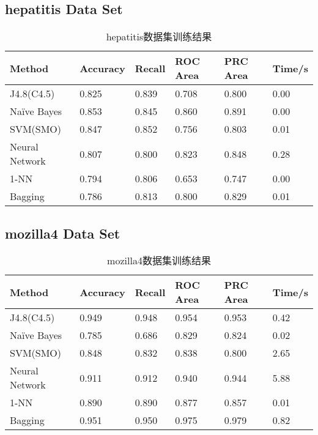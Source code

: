 \documentclass[a4paper,UTF8]{article}
\numberwithin{equation}{section}
\begin{document}
\subsection{hepatitis Data Set}
\begin{table}[H]
\centering
\caption{hepatitis数据集训练结果}
\label{my-label}
\begin{tabular}{l|lllll}
\hline
Method         & Accuracy & Recall & ROC Area & PRC Area & Time/s \\ \hline
J4.8(C4.5)     & 0.825    & 0.839  & 0.708    & 0.800    & 0.00   \\ \hline
Naïve Bayes   & 0.853    & 0.845  & 0.860    & 0.891    & 0.00   \\ \hline
SVM(SMO)       & 0.847    & 0.852  & 0.756    & 0.803    & 0.01   \\ \hline
Neural Network & 0.807    & 0.800  & 0.823    & 0.848    & 0.28   \\ \hline
1-NN           & 0.794    & 0.806  & 0.653    & 0.747    & 0.00   \\ \hline
Bagging        & 0.786    & 0.813  & 0.800    & 0.829    & 0.01   \\ \hline
\end{tabular}
\end{table}

\subsection{mozilla4 Data Set}
\begin{table}[H]
\centering
\caption{mozilla4数据集训练结果}
\label{my-label}
\begin{tabular}{l|lllll}
\hline
Method         & Accuracy & Recall & ROC Area & PRC Area & Time/s \\ \hline
J4.8(C4.5)     & 0.949    & 0.948  & 0.954    & 0.953    & 0.42   \\ \hline
Naïve Bayes   & 0.785    & 0.686  & 0.829    & 0.824    & 0.02   \\ \hline
SVM(SMO)       & 0.848    & 0.832  & 0.838    & 0.800    & 2.65   \\ \hline
Neural Network & 0.911    & 0.912  & 0.940    & 0.944    & 5.88   \\ \hline
1-NN           & 0.890    & 0.890  & 0.877    & 0.857    & 0.01   \\ \hline
Bagging        & 0.951    & 0.950  & 0.975    & 0.979    & 0.82   \\ \hline
\end{tabular}
\end{table}
\end{document}
